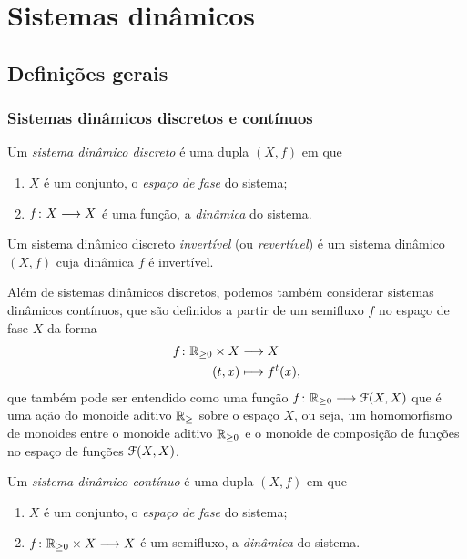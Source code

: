 \chapter{Sistemas dinâmicos}

\section{Definições gerais}

\subsection{Sistemas dinâmicos discretos e contínuos}

\begin{definition}
Um \emph{sistema dinâmico discreto} é uma dupla $(X,f)$ em que
	\begin{enumerate}
	\item $X$ é um conjunto, o \emph{espaço de fase} do sistema;
	\item ${f}\colon {X} \longrightarrow {X}$ é uma função, a \emph{dinâmica} do sistema.
	\end{enumerate}
Um sistema dinâmico discreto \emph{invertível} (ou \emph{revertível}) é um sistema dinâmico $(X,f)$ cuja dinâmica $f$ é invertível.
\end{definition}

Além de sistemas dinâmicos discretos, podemos também considerar sistemas dinâmicos contínuos, que são definidos a partir de um semifluxo $f$ no espaço de fase $X$ da forma
	\begin{align*}
	{f}\colon {\mathbb{R}_{\geq 0}  \times X} &\longrightarrow {X} \\{(t,x)} &\longmapsto f^t(x),
	\end{align*}
que também pode ser entendido como uma função ${f}\colon {\mathbb{R}_{\geq 0}} \longrightarrow {\mathcal{F}(X,X)}$ que é uma ação do monoide aditivo $\mathbb{R}_{\geq}$ sobre o espaço $X$, ou seja, um homomorfismo de monoides entre o monoide aditivo $\mathbb{R}_{\geq 0}$ e o monoide de composição de funções no espaço de funções $\mathcal{F}(X,X)$.

\begin{definition}
Um \emph{sistema dinâmico contínuo} é uma dupla $(X,f)$ em que
	\begin{enumerate}
	\item $X$ é um conjunto, o \emph{espaço de fase} do sistema;
	\item ${f}\colon {\mathbb{R}_{\geq 0}  \times X} \longrightarrow {X}$ é um semifluxo, a \emph{dinâmica} do sistema.
	\end{enumerate}
\end{definition}

